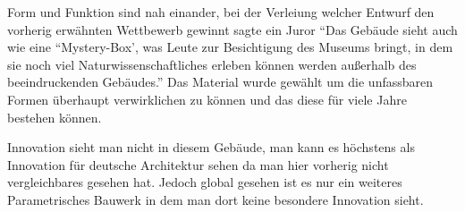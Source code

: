 \documentclass[a4paper, 12p]{article}
\begin{document}
Form und Funktion sind nah einander, bei der Verleiung welcher Entwurf den
vorherig erwähnten Wettbewerb gewinnt sagte ein Juror ``Das Gebäude sieht auch wie
eine ``Mystery-Box', was Leute zur Besichtigung des Museums bringt, in dem sie
noch viel Naturwissenschaftliches erleben können werden außerhalb des
beeindruckenden Gebäudes.''
Das Material wurde gewählt um die unfassbaren Formen überhaupt verwirklichen zu
können und das diese für viele Jahre bestehen können.


Innovation sieht man nicht in diesem Gebäude, man kann es höchstens als
Innovation für deutsche Architektur sehen da man hier vorherig nicht
vergleichbares gesehen hat. Jedoch global gesehen ist es nur ein weiteres
Parametrisches Bauwerk in dem man dort keine besondere Innovation sieht.





\end{document}
